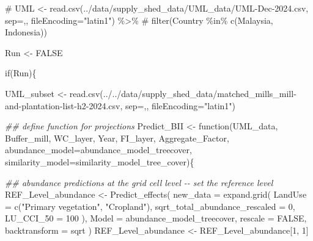 \documentclass[
  letterpaper,
  DIV=11,
  numbers=noendperiod]{scrartcl}
\newenvironment{Shaded}{\begin{snugshade}}{\end{snugshade}}
\newcommand{\AttributeTok}[1]{\textcolor[rgb]{0.40,0.45,0.13}{#1}}
\newcommand{\CommentTok}[1]{\textcolor[rgb]{0.37,0.37,0.37}{#1}}
\newcommand{\ConstantTok}[1]{\textcolor[rgb]{0.56,0.35,0.01}{#1}}
\newcommand{\ControlFlowTok}[1]{\textcolor[rgb]{0.00,0.23,0.31}{#1}}
\newcommand{\DecValTok}[1]{\textcolor[rgb]{0.68,0.00,0.00}{#1}}
\newcommand{\DocumentationTok}[1]{\textcolor[rgb]{0.37,0.37,0.37}{\textit{#1}}}
\newcommand{\FunctionTok}[1]{\textcolor[rgb]{0.28,0.35,0.67}{#1}}
\newcommand{\NormalTok}[1]{\textcolor[rgb]{0.00,0.23,0.31}{#1}}
\newcommand{\OtherTok}[1]{\textcolor[rgb]{0.00,0.23,0.31}{#1}}
\newcommand{\StringTok}[1]{\textcolor[rgb]{0.13,0.47,0.30}{#1}}
\begin{document}
\begin{Shaded}
\begin{Highlighting}[]
\CommentTok{\# UML \textless{}{-} read.csv(\textquotesingle{}../data/supply\_shed\_data/UML\_data/UML{-}Dec{-}2024.csv\textquotesingle{}, sep=\textquotesingle{},\textquotesingle{}, fileEncoding="latin1") \%\textgreater{}\% }
\CommentTok{\#   filter(Country \%in\% c(\textquotesingle{}Malaysia\textquotesingle{}, \textquotesingle{}Indonesia\textquotesingle{}))}

\NormalTok{Run }\OtherTok{\textless{}{-}} \ConstantTok{FALSE}

\ControlFlowTok{if}\NormalTok{(Run)\{}
  
\NormalTok{UML\_subset }\OtherTok{\textless{}{-}} \FunctionTok{read.csv}\NormalTok{(}\StringTok{\textquotesingle{}../../data/supply\_shed\_data/matched\_mills\_mill{-}and{-}plantation{-}list{-}h2{-}2024.csv\textquotesingle{}}\NormalTok{, }\AttributeTok{sep=}\StringTok{\textquotesingle{},\textquotesingle{}}\NormalTok{, }\AttributeTok{fileEncoding=}\StringTok{"latin1"}\NormalTok{) }

\DocumentationTok{\#\# define function for projections}
\NormalTok{Predict\_BII }\OtherTok{\textless{}{-}} \ControlFlowTok{function}\NormalTok{(UML\_data, }
\NormalTok{                        Buffer\_mill,}
\NormalTok{                        WC\_layer,}
\NormalTok{                        Year,}
\NormalTok{                        FI\_layer,}
\NormalTok{                        Aggregate\_Factor,}
                        \AttributeTok{abundance\_model=}\NormalTok{abundance\_model\_treecover,}
                        \AttributeTok{similarity\_model=}\NormalTok{similarity\_model\_tree\_cover)\{}
  
      \DocumentationTok{\#\# abundance predictions at the grid cell level {-}{-} set the reference level}
\NormalTok{    REF\_Level\_abundance }\OtherTok{\textless{}{-}} 
      \FunctionTok{Predict\_effects}\NormalTok{(}
        \AttributeTok{new\_data =} \FunctionTok{expand.grid}\NormalTok{(}
          \AttributeTok{LandUse =} \FunctionTok{c}\NormalTok{(}\StringTok{"Primary vegetation"}\NormalTok{,}
                      \StringTok{"Cropland"}\NormalTok{),}
          \AttributeTok{sqrt\_total\_abundance\_rescaled =}
            \DecValTok{0}\NormalTok{,}
          \AttributeTok{LU\_CCI\_50 =} \DecValTok{100}
\NormalTok{        ),}
        \AttributeTok{Model =}\NormalTok{ abundance\_model\_treecover,}
        \AttributeTok{rescale =} \ConstantTok{FALSE}\NormalTok{,}
        \AttributeTok{backtransform =} \StringTok{\textquotesingle{}sqrt\textquotesingle{}}
\NormalTok{      )}
\NormalTok{    REF\_Level\_abundance }\OtherTok{\textless{}{-}}\NormalTok{ REF\_Level\_abundance[}\DecValTok{1}\NormalTok{, }\DecValTok{1}\NormalTok{]}
    

\end{Highlighting}
\end{Shaded}
\end{document}
